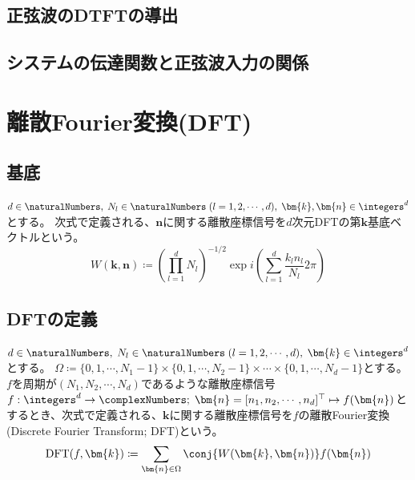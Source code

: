 			\section{正弦波のDTFTの導出}
			\section{システムの伝達関数と正弦波入力の関係}
		\chapter{離散Fourier変換(DFT)}
			\section{基底}
				$d\in\naturalNumbers,\;N_l\in\naturalNumbers\;(l=1,2,\cdots,d),\;\bm{k},\bm{n}\in\integers^d$とする。
				次式で定義される、$\bm{n}$に関する離散座標信号を$d$次元DFTの第$\bm{k}$基底ベクトルという。
				\[ W(\bm{k},\bm{n}) \coloneqq \left(\prod_{l=1}^d N_l\right)^{-1/2} \exp i\left(\sum_{l=1}^d \frac{k_l n_l}{N_l}2\pi\right)\]

			\section{DFTの定義}
				\label{DFTの定義}
				$d\in\naturalNumbers,\;N_l\in\naturalNumbers\;(l=1,2,\cdots,d),\;\bm{k}\in\integers^d$とする。
				$\Omega \coloneqq \{0,1,\cdots,N_1-1\}\times\{0,1,\cdots,N_2-1\}\times\cdots\times\{0,1,\cdots,N_d-1\}$とする。
				$f$を周期が$(N_1,N_2,\cdots,N_d)$であるような離散座標信号$f: \integers^d\to\complexNumbers;\;\bm{n} = [n_1,n_2,\cdots,n_d]^\top \mapsto f(\bm{n})$とするとき、次式で定義される、$\bm{k}$に関する離散座標信号を$f$の離散Fourier変換(Discrete Fourier Transform; DFT)という。
				\[ \text{DFT}(f,\bm{k}) \coloneqq \sum_{\bm{n}\in\Omega} \conj{W(\bm{k},\bm{n})} f(\bm{n}) \]

